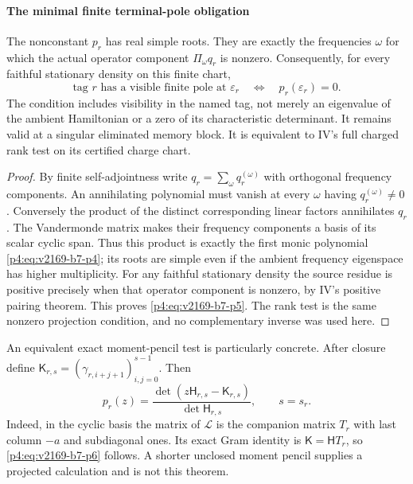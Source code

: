 \documentclass[12pt,a4paper]{article}
\begin{document}
\paragraph{The minimal finite terminal-pole obligation}
\begin{theorem}
\label{p4:v2169:b7:thm:poles}
The nonconstant $p_r$ has real simple roots. They are exactly the frequencies
$\omega$ for which the actual operator component
$\Pi_\omega q_r$ is nonzero. Consequently, for every faithful stationary
density on this finite chart,
\begin{equation}
 \boxed{\text{tag }r\text{ has a visible finite pole at }\varepsilon_r
       \quad\Longleftrightarrow\quad p_r(\varepsilon_r)=0.}
 \label{p4:eq:v2169-b7-p5}
\end{equation}
The condition includes visibility in the named tag, not merely an eigenvalue
of the ambient Hamiltonian or a zero of its characteristic determinant.
It remains valid at a singular eliminated memory block. It is equivalent
to IV's full charged rank test on its certified charge chart.
\end{theorem}
\begin{proof}
By finite self-adjointness write $q_r=\sum_\omega q_r^{(\omega)}$ with
orthogonal frequency components. An annihilating polynomial must vanish at
every $\omega$ having $q_r^{(\omega)}\ne0$. Conversely the product of the
distinct corresponding linear factors annihilates $q_r$. The Vandermonde
matrix makes their frequency components a basis of its scalar cyclic span.
Thus this product is exactly the first monic polynomial \eqref{p4:eq:v2169-b7-p4}; its roots are
simple even if the ambient frequency eigenspace has higher multiplicity.
For any faithful stationary density the source residue is positive precisely
when that operator component is nonzero, by IV's positive pairing theorem.
This proves \eqref{p4:eq:v2169-b7-p5}. The rank test is the same nonzero projection condition,
and no complementary inverse was used here.
\end{proof}

An equivalent exact moment-pencil test is particularly concrete. After
closure define $\mathsf K_{r,s}=(\gamma_{r,i+j+1})_{i,j=0}^{s-1}$. Then
\begin{equation}
 \boxed{p_r(z)=\frac{\det(z\mathsf H_{r,s}-\mathsf K_{r,s})}
                        {\det\mathsf H_{r,s}},\qquad s=s_r.}
 \label{p4:eq:v2169-b7-p6}
\end{equation}
Indeed, in the cyclic basis the matrix of $\mathcal L$ is the companion
matrix $T_r$ with last column $-a$ and subdiagonal ones. Its exact Gram
identity is $\mathsf K=\mathsf H T_r$, so \eqref{p4:eq:v2169-b7-p6} follows. A shorter unclosed
moment pencil supplies a projected calculation and is not this theorem.
\end{document}
